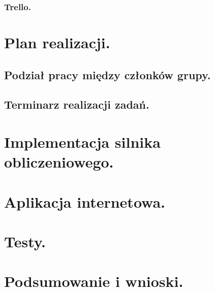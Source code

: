 \documentclass[a4paper,12pt]{article}		%
\begin{document}
\subsubsection{Trello.}
\section{Plan realizacji.}
\subsection{Podział pracy między członków grupy.}
\subsection{Terminarz realizacji zadań.}
\section{Implementacja silnika obliczeniowego.}
\section{Aplikacja internetowa.}
\section{Testy.}
\section{Podsumowanie i wnioski.}
\end{document}
